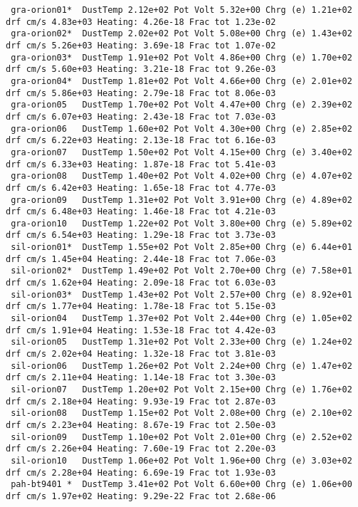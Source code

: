 {\setverbatimfontsize{\tiny}
\begin{verbatim}
 gra-orion01*  DustTemp 2.12e+02 Pot Volt 5.32e+00 Chrg (e) 1.21e+02 drf cm/s 4.83e+03 Heating: 4.26e-18 Frac tot 1.23e-02
 gra-orion02*  DustTemp 2.02e+02 Pot Volt 5.08e+00 Chrg (e) 1.43e+02 drf cm/s 5.26e+03 Heating: 3.69e-18 Frac tot 1.07e-02
 gra-orion03*  DustTemp 1.91e+02 Pot Volt 4.86e+00 Chrg (e) 1.70e+02 drf cm/s 5.60e+03 Heating: 3.21e-18 Frac tot 9.26e-03
 gra-orion04*  DustTemp 1.81e+02 Pot Volt 4.66e+00 Chrg (e) 2.01e+02 drf cm/s 5.86e+03 Heating: 2.79e-18 Frac tot 8.06e-03
 gra-orion05   DustTemp 1.70e+02 Pot Volt 4.47e+00 Chrg (e) 2.39e+02 drf cm/s 6.07e+03 Heating: 2.43e-18 Frac tot 7.03e-03
 gra-orion06   DustTemp 1.60e+02 Pot Volt 4.30e+00 Chrg (e) 2.85e+02 drf cm/s 6.22e+03 Heating: 2.13e-18 Frac tot 6.16e-03
 gra-orion07   DustTemp 1.50e+02 Pot Volt 4.15e+00 Chrg (e) 3.40e+02 drf cm/s 6.33e+03 Heating: 1.87e-18 Frac tot 5.41e-03
 gra-orion08   DustTemp 1.40e+02 Pot Volt 4.02e+00 Chrg (e) 4.07e+02 drf cm/s 6.42e+03 Heating: 1.65e-18 Frac tot 4.77e-03
 gra-orion09   DustTemp 1.31e+02 Pot Volt 3.91e+00 Chrg (e) 4.89e+02 drf cm/s 6.48e+03 Heating: 1.46e-18 Frac tot 4.21e-03
 gra-orion10   DustTemp 1.22e+02 Pot Volt 3.80e+00 Chrg (e) 5.89e+02 drf cm/s 6.54e+03 Heating: 1.29e-18 Frac tot 3.73e-03
 sil-orion01*  DustTemp 1.55e+02 Pot Volt 2.85e+00 Chrg (e) 6.44e+01 drf cm/s 1.45e+04 Heating: 2.44e-18 Frac tot 7.06e-03
 sil-orion02*  DustTemp 1.49e+02 Pot Volt 2.70e+00 Chrg (e) 7.58e+01 drf cm/s 1.62e+04 Heating: 2.09e-18 Frac tot 6.03e-03
 sil-orion03*  DustTemp 1.43e+02 Pot Volt 2.57e+00 Chrg (e) 8.92e+01 drf cm/s 1.77e+04 Heating: 1.78e-18 Frac tot 5.15e-03
 sil-orion04   DustTemp 1.37e+02 Pot Volt 2.44e+00 Chrg (e) 1.05e+02 drf cm/s 1.91e+04 Heating: 1.53e-18 Frac tot 4.42e-03
 sil-orion05   DustTemp 1.31e+02 Pot Volt 2.33e+00 Chrg (e) 1.24e+02 drf cm/s 2.02e+04 Heating: 1.32e-18 Frac tot 3.81e-03
 sil-orion06   DustTemp 1.26e+02 Pot Volt 2.24e+00 Chrg (e) 1.47e+02 drf cm/s 2.11e+04 Heating: 1.14e-18 Frac tot 3.30e-03
 sil-orion07   DustTemp 1.20e+02 Pot Volt 2.15e+00 Chrg (e) 1.76e+02 drf cm/s 2.18e+04 Heating: 9.93e-19 Frac tot 2.87e-03
 sil-orion08   DustTemp 1.15e+02 Pot Volt 2.08e+00 Chrg (e) 2.10e+02 drf cm/s 2.23e+04 Heating: 8.67e-19 Frac tot 2.50e-03
 sil-orion09   DustTemp 1.10e+02 Pot Volt 2.01e+00 Chrg (e) 2.52e+02 drf cm/s 2.26e+04 Heating: 7.60e-19 Frac tot 2.20e-03
 sil-orion10   DustTemp 1.06e+02 Pot Volt 1.96e+00 Chrg (e) 3.03e+02 drf cm/s 2.28e+04 Heating: 6.69e-19 Frac tot 1.93e-03
 pah-bt9401 *  DustTemp 3.41e+02 Pot Volt 6.60e+00 Chrg (e) 1.06e+00 drf cm/s 1.97e+02 Heating: 9.29e-22 Frac tot 2.68e-06

\end{verbatim}}
